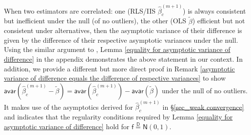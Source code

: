 \documentclass[11pt, letterpaper]{article}
\numberwithin{algorithm}{section}
\numberwithin{assumption}{section}
\numberwithin{lemma}{section}
\numberwithin{theorem}{section}
\numberwithin{corollary}{section}
\numberwithin{remark}{section}
\numberwithin{equation}{section}
\numberwithin{figure}{section}
\numberwithin{table}{section}
\begin{document}
When two estimators are correlated: one (RLS/IIS $\widehat{\beta}_{c}^{(m + 1)}$) is always consistent but inefficient under the null (of no outliers), the other (OLS $\widetilde{\beta}$) efficient but not consistent under alternatives, then the asymptotic variance of their difference is given by the difference of their respective asymptotic variances under the null. Using the similar argument to \cite{hausman1978specification}, Lemma \ref{equality for asymptotic variance of difference} in the appendix demonstrates the above statement in our context. In addition, we provide a different but more direct proof in Remark \ref{asymptotic variance of difference equals the difference of respective variances} to show $\mathsf{avar}(\widehat{\beta}_{c}^{(m + 1)} - \widetilde{\beta}) = \mathsf{avar}(\widehat{\beta}_{c}^{(m + 1)}) - \mathsf{avar}(\widetilde{\beta})$ under the null of no outliers. It makes use of the asymptotics derived for $\widehat{\beta}_{c}^{(m + 1)}$ in \S \ref{sec_weak convergence} and indicates that the regularity conditions required by Lemma \ref{equality for asymptotic variance of difference} hold for $\mathsf{f} \overset{\mathsf{D}}{=} \mathsf{N}(0, 1)$.
\end{document}
